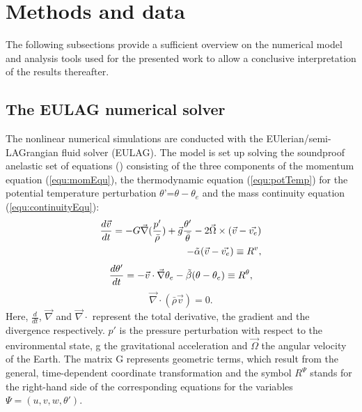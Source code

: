 \chapter{Methods and data}

The following subsections provide a sufficient overview on the numerical model and analysis tools used for the presented work to allow a conclusive interpretation of the results thereafter.

\section{The EULAG numerical solver}
\label{sec:EULAG}

The nonlinear numerical simulations are conducted with the EUlerian/semi- LAGrangian fluid solver (EULAG). The model is set up solving the soundproof anelastic set of equations (\cite{lipps_scale_1982}) consisting of the three components of the momentum equation (\ref{equ:momEqu}), the thermodynamic equation (\ref{equ:potTemp}) for the potential temperature perturbation $\theta$'=$\theta-\theta_e$ and the mass continuity equation (\ref{equ:continuityEqu}):
%
\begin{equation}
\begin{aligned}
    \frac{d \Vec{v}}{dt} = -G \Vec{\nabla} (\frac{p'}{\bar{\rho}}) +  \Vec{g} \frac{\theta'}{\bar{\theta}} - 2 \Vec{\Omega} \times (\Vec{v}-\Vec{v_e}) \\
    - \Tilde{\alpha} (\Vec{v}-\Vec{v_e}) \equiv R^{v},
    \label{equ:momEqu}
\end{aligned}
\end{equation}
%
\begin{equation}
    \frac{d \theta'}{dt} = -\Vec{v} \cdot \Vec{\nabla} \theta_e - \Tilde{\beta} (\theta-\theta_e) \equiv R^{\theta},
    \label{equ:potTemp}
\end{equation}
%
\begin{equation}
    \Vec{\nabla} \cdot (\bar{\rho} \Vec{v}) = 0.
    \label{equ:continuityEqu}
\end{equation}
%
Here, $\frac{d}{dt}$, $\Vec{\nabla}$ and $\Vec{\nabla} \cdot$ represent the total derivative, the gradient and the divergence respectively. $p'$ is the pressure perturbation with respect to the environmental state, g the gravitational acceleration and $\Vec{\Omega}$ the angular velocity of the Earth. The matrix G represents geometric terms, which result from the general, time-dependent coordinate transformation and the symbol $R^{\Psi}$ stands for the right-hand side of the corresponding equations for the variables $\Psi = (u,v,w,\theta')$.
